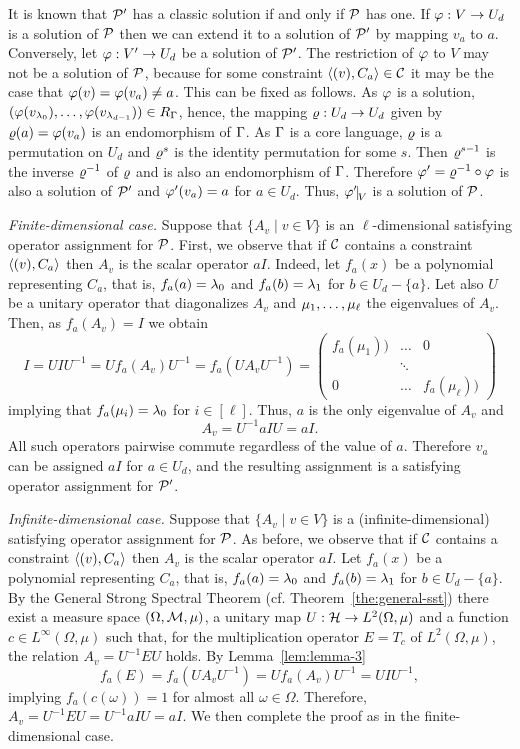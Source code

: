 It is known \cite{Jeavons99:expressive} that ${\mathcal P}'$ has a classic solution if and only if ${\mathcal P}$ has one. If $\varphi:V\to U_d$ is a solution of ${\mathcal P}$ then we can extend it to a solution of ${\mathcal P}'$ by mapping $v_a$ to $a$. Conversely, let $\varphi:V'\to U_d$ be a solution of ${\mathcal P}'$. The restriction of $\varphi$ to $V$ may not be a solution of ${\mathcal P}$, because for some constraint $\langle (v),C_a \rangle\in{\mathcal C}$ it may be the case that $\varphi(v)=\varphi(v_a)\ne a$. This can be fixed as follows.  As $\varphi$ is a solution, $(\varphi(v_{\lambda_0}),\ldots, \varphi(v_{\lambda_{d-1}}))\in R_\Gamma$, hence, the mapping $\varrho:U_d\to U_d$ given by $\varrho(a)=\varphi(v_a)$ is an endomorphism of $\Gamma$.  As $\Gamma$ is a core language, $\varrho$ is a permutation on $U_d$ and $\varrho^s$ is the identity permutation for some $s$. Then $\varrho^{s-1}$ is the inverse $\varrho^{-1}$ of $\varrho$ and is also an endomorphism of $\Gamma$. Therefore $\varphi'=\varrho^{-1}\circ\varphi$ is also a solution of ${\mathcal P}'$ and $\varphi'(v_a)=a$ for $a\in U_d$. Thus, $\vf'\red V$ is a solution of ${\mathcal P}$.

\smallskip

{\it Finite-dimensional case.}
Suppose that $\{A_v\mid v\in V\}$ is an $\ell$-dimensional satisfying operator assignment for ${\mathcal P}$. First, we observe that if ${\mathcal C}$ contains a constraint $\langle (v),C_a \rangle$ then $A_v$ is the scalar operator $aI$. Indeed, let $f_a(x)$ be a polynomial representing $C_a$, that is,  $f_a(a)=\lambda_0$ and $f_a(b)=\lambda_1$ for $b\in U_d-\{a\}$. Let also $U$ be a unitary operator that diagonalizes $A_v$ and $\mu _1,\ldots, \mu _{\ell}$ the eigenvalues of $A_v$. Then, as $f_a(A_v)=I$ we obtain
\[
I=UIU^{-1}=Uf_a(A_v)U^{-1}=f_a(UA_vU^{-1})=
\left(\begin{array}{ccc}f_a(\mu_1))&\dots&0\\ &\ddots&\\ 0&\dots&f_a(\mu_\ell))\end{array}\right)
\]
implying that $f_a(\mu_i)=\lambda_0$ for $i\in[\ell]$. Thus, $a$ is the only eigenvalue of $A_v$ and 
\[
A_v=U^{-1}aIU=aI.
\]
All such operators pairwise commute regardless of the value of $a$. Therefore $v_a$ can be assigned $aI$ for $a\in U_d$, and the resulting assignment is a satisfying operator assignment for ${\mathcal P}'$.

\smallskip

{\it Infinite-dimensional case.}
Suppose that $\{A_v\mid v\in V\}$ is a (infinite-dimensional) satisfying operator assignment for ${\mathcal P}$. As before, we observe that if ${\mathcal C}$ contains a constraint $\langle (v),C_a \rangle$ then $A_v$ is the scalar operator $aI$. Let $f_a(x)$ be a polynomial representing $C_a$, that is,  $f_a(a)=\lambda_0$ and $f_a(b)=\lambda_1$ for $b\in U_d-\{a\}$. By the General Strong Spectral Theorem (cf. Theorem~\ref{the:general-sst}) there exist a measure space $(\Omega,{\mathcal M},\mu)$, a unitary map $U:{\mathcal H}\to L^2(\Omega,\mu)$ and a function $c\in L^\infty(\Omega,\mu)$ such that, for the multiplication operator $E = T_c$ of $L^2(\Omega,\mu)$, the relation $A_v = U^{-1} EU$ holds. By Lemma~\ref{lem:lemma-3} 
\[
f_a(E)=f_a(UA_vU^{-1})=Uf_a(A_v)U^{-1}=UIU^{-1},
\]
implying $f_a(c(\omega))=1$ for almost all $\omega\in\Omega$. Therefore, $A_v=U^{-1}EU=U^{-1}aIU=aI$. We then complete the proof as in the finite-dimensional case.


